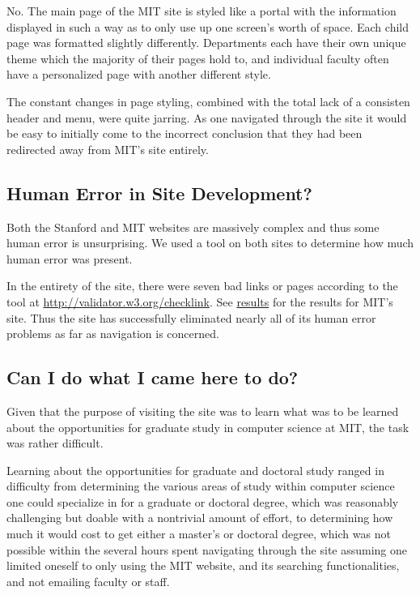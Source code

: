 No. The main page of the MIT site is styled like a portal with the information displayed in such a way as to
only use up one screen's worth of space. Each child page was formatted slightly differently.
Departments each have their own unique theme which the majority of their pages hold to, and
individual faculty often have a personalized page with another different style.

The constant changes in page styling, combined with the total lack of a consisten header and
menu, were quite jarring. As one navigated through the site it would be easy to initially
come to the incorrect conclusion that they had been redirected away from MIT's site entirely.

\subsection*{Human Error in Site Development?}

Both the Stanford and MIT websites are massively complex and thus some human error is unsurprising.
We used a tool on both sites to determine how much human error was present.

In the entirety of the site, there were seven bad links or pages according to the tool at
\url{http://validator.w3.org/checklink}. See
\href{http://validator.w3.org/checklink?uri=mit.edu&hide_type=all&depth=&check=Check#results1}{results}
for the results for MIT's site. Thus the site has successfully eliminated nearly all of its
human error problems as far as navigation is concerned.

\subsection*{Can I do what I came here to do?}

Given that the purpose of visiting the site was to learn what was to be learned about the
opportunities for graduate study in computer science at MIT, the task was rather difficult.

Learning about the opportunities for graduate and doctoral study ranged in difficulty from
determining the various areas of study within computer science one could specialize in
for a graduate or doctoral degree, which was reasonably challenging but doable with a
nontrivial amount of effort, to determining how much it would cost to get either a master's
or doctoral degree, which was not possible within the several hours spent navigating through
the site assuming one limited oneself to only using the MIT website, and its searching
functionalities, and not emailing faculty or staff.

